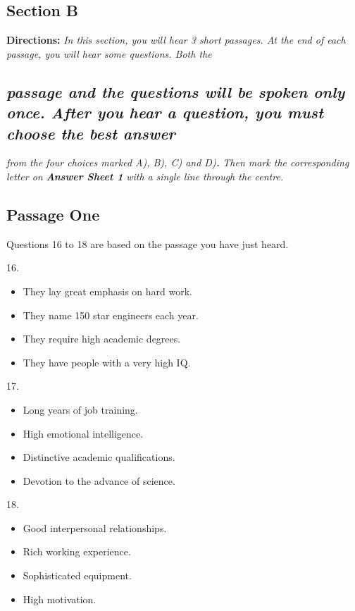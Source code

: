 \documentclass[UTF8,11pt]{ctexart}
\begin{document}
\subsection*{\textbf{Section B}}


\textbf{Directions:}\textit{ In this section, you will hear 3 short passages. At the end of each passage, you will hear some questions. Both the}


\subsection*{\textit{passage and the questions will be spoken only once. After you hear a question, you must choose the best answer}}


\textit{from the four choices marked A), B), C) and D)}\textbf{\textit{.}}\textit{ Then mark the corresponding letter on}\textbf{\textit{ Answer Sheet 1}}\textit{ with a} \textit{single line through the centre.}


\subsection*{Passage One}


Questions 16 to 18 are based on the passage you have just heard.


16.


\begin{itemize}[leftmargin=2em,itemsep=.2em,topsep=.4em]\item[A.] They lay great emphasis on hard work.
\item[B.] They name 150 star engineers each year.
\item[C.] They require high academic degrees.
\item[D.] They have people with a very high IQ.
\end{itemize}

17.


\begin{itemize}[leftmargin=2em,itemsep=.2em,topsep=.4em]\item[A.] Long years of job training.
\item[B.] High emotional intelligence.
\item[C.] Distinctive academic qualifications.
\item[D.] Devotion to the advance of science.
\end{itemize}

18.


\begin{itemize}[leftmargin=2em,itemsep=.2em,topsep=.4em]\item[A.] Good interpersonal relationships.
\item[B.] Rich working experience.
\item[C.] Sophisticated equipment.
\item[D.] High motivation.
\end{itemize}
\end{document}
